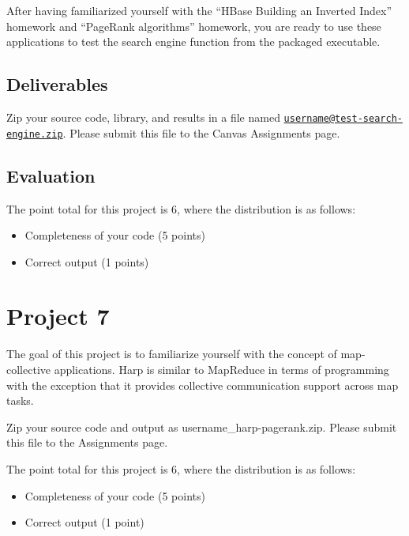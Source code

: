 After having familiarized yourself with the ``HBase Building an Inverted
Index'' homework and ``PageRank algorithms'' homework, you are ready to
use these applications to test the search engine function from the
packaged executable.

\section{Deliverables}\label{deliverables}

Zip your source code, library, and results in a file named
\href{mailto:username@test-search-engine.zip}{\nolinkurl{username@test-search-engine.zip}}.
Please submit this file to the Canvas Assignments page.

\section{Evaluation}\label{evaluation}

The point total for this project is 6, where the distribution is as
follows:

\begin{itemize}
\tightlist
\item
  Completeness of your code (5 points)
\item
  Correct output (1 points)
\end{itemize}



\chapter{Project 7}\label{project-7}

The goal of this project is to familiarize yourself with the concept of
map-collective applications. Harp is similar to MapReduce in terms of
programming with the exception that it provides collective communication
support across map tasks.

Zip your source code and output as username\_harp-pagerank.zip. Please
submit this file to the Assignments page.

The point total for this project is 6, where the distribution is as
follows:

\begin{itemize}
\tightlist
\item
  Completeness of your code (5 points)
\item
  Correct output (1 point)
\end{itemize}

